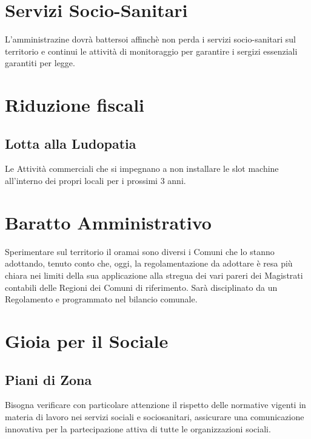 \documentclass[a4paper,14pt,italian]{sphinxmanual}
\begin{document}
\section{Servizi Socio-Sanitari}
\label{\detokenize{salute:servizi-socio-sanitari}}
L’amministrazine dovrà battersoi affinchè non perda i servizi socio-sanitari sul territorio e continui le attività di monitoraggio per garantire i sergizi essenziali garantiti per legge.


\section{Riduzione fiscali}
\label{\detokenize{salute:riduzione-fiscali}}

\subsection{Lotta alla Ludopatia}
\label{\detokenize{salute:lotta-alla-ludopatia}}
Le Attività commerciali che si impegnano a non installare le slot machine all’interno dei propri locali per i prossimi 3 anni.


\section{Baratto Amministrativo}
\label{\detokenize{salute:baratto-amministrativo}}
Sperimentare sul territorio il  oramai sono diversi i Comuni che lo stanno adottando, tenuto conto che, oggi, la regolamentazione da adottare è resa più chiara nei limiti della sua applicazione alla stregua dei vari pareri dei Magistrati contabili delle Regioni dei Comuni di riferimento.
Sarà disciplinato da un Regolamento e programmato nel bilancio comunale.


\section{Gioia per il Sociale}
\label{\detokenize{salute:gioia-per-il-sociale}}

\subsection{Piani di Zona}
\label{\detokenize{salute:piani-di-zona}}
Bisogna verificare con particolare attenzione il rispetto delle normative vigenti in materia di lavoro nei servizi sociali e sociosanitari, assicurare una comunicazione innovativa per la partecipazione attiva di tutte le organizzazioni sociali.
\end{document}

